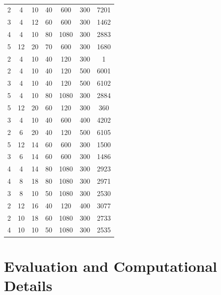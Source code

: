 \documentclass[a4paper]{article}
\begin{document}
\begin{table}
\begin{tabular}{ccccccc}
2	&4	&10	&40	&600	&300	&7201	\\
3	&4	&12	&60	&600	&300	&1462	\\
4	&4	&10	&80	&1080	&300	&2883	\\
5	&12	&20	&70	&600	&300	&1680	\\
		\hline
2	&4	&10	&40	&120	&300	&1	\\
2	&4	&10	&40	&120	&500	&6001	\\
3	&4	&10	&40	&120	&500	&6102	\\
5	&4	&10	&80	&1080	&300	&2884	\\
5	&12	&20	&60	&120	&300	&360	\\
		\hline
3	&4	&10	&40	&600	&400	&4202	\\
2	&6	&20	&40	&120	&500	&6105	\\
5	&12	&14	&60	&600	&300	&1500	\\
3	&6	&14	&60	&600	&300	&1486	\\
4	&4	&14	&80	&1080	&300	&2923	\\
		\hline
4	&8	&18	&80	&1080	&300	&2971	\\
3	&8	&10	&50	&1080	&300	&2530	\\
2	&12	&16	&40	&120	&400	&3077	\\
2	&10	&18	&60	&1080	&300	&2733	\\
4	&10	&10	&50	&1080	&300	&2535	\\
		\hline
		\hline
	\end{tabular}
	\caption{}
	\label{tab:emma}
\end{table}


\section{Evaluation and Computational Details}
\end{document}
